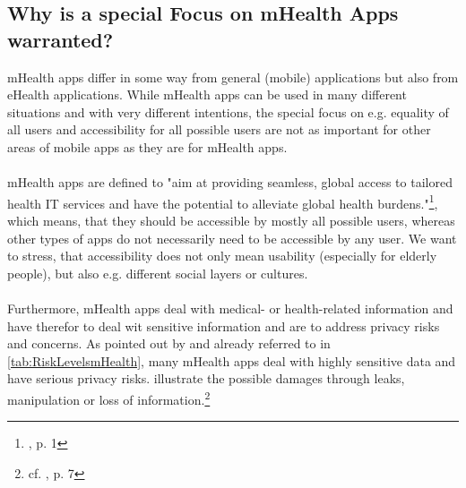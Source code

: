 \subsection{Why is a special Focus on mHealth Apps warranted?}
mHealth apps differ in some way from general (mobile) applications but also from eHealth applications. While mHealth apps can be used in many different situations and with very different intentions, the special focus on e.g. equality of all users and accessibility for all possible users are not as important for other areas of mobile apps as they are for mHealth apps. 
\\
\\
mHealth apps are defined to "aim at providing seamless, global access to tailored health IT services and have the potential to alleviate global health burdens."\footnote{\cite{Dehling.2013}, p. 1}, which means, that they should be accessible by mostly all possible users, whereas other types of apps do not necessarily need to be accessible by any user. We want to stress, that accessibility does not only mean usability (especially for elderly people), but also e.g. different social layers or cultures.
\\
\\
Furthermore, mHealth apps deal with medical- or health-related information and have therefor to deal wit sensitive information and are to address privacy risks and concerns. As pointed out by \cite{Njie.2013} and already referred to in \ref{tab:RiskLevelsmHealth}, many mHealth apps deal with highly sensitive data and have serious privacy risks. \cite{Dehling.2013} illustrate the possible damages through leaks, manipulation or loss of information.\footnote{cf. \cite{Dehling.2013}, p. 7}